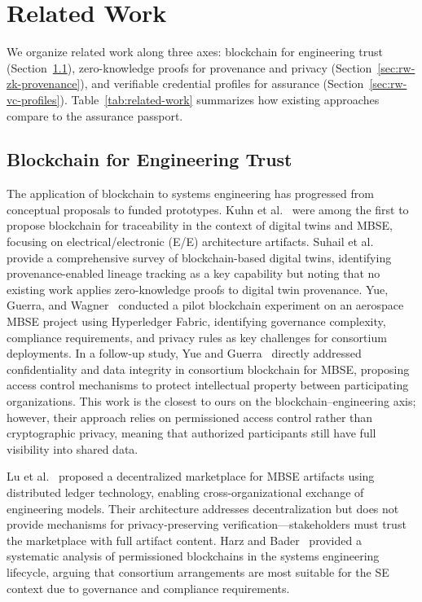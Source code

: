 \section{Related Work}
\label{sec:related-work}

We organize related work along three axes: blockchain for engineering trust (Section~\ref{sec:rw-blockchain-eng}), zero-knowledge proofs for provenance and privacy (Section~\ref{sec:rw-zk-provenance}), and verifiable credential profiles for assurance (Section~\ref{sec:rw-vc-profiles}).
Table~\ref{tab:related-work} summarizes how existing approaches compare to the assurance passport.

\subsection{Blockchain for Engineering Trust}
\label{sec:rw-blockchain-eng}

The application of blockchain to systems engineering has progressed from conceptual proposals to funded prototypes.
Kuhn et al.~\cite{kuhn2017digital_twin_blockchain} were among the first to propose blockchain for traceability in the context of digital twins and MBSE, focusing on electrical/electronic (E/E) architecture artifacts.
Suhail et al.~\cite{suhail2022bcdt} provide a comprehensive survey of blockchain-based digital twins, identifying provenance-enabled lineage tracking as a key capability but noting that no existing work applies zero-knowledge proofs to digital twin provenance.
Yue, Guerra, and Wagner~\cite{yue2021blockchain_mbse} conducted a pilot blockchain experiment on an aerospace MBSE project using Hyperledger Fabric, identifying governance complexity, compliance requirements, and privacy rules as key challenges for consortium deployments.
In a follow-up study, Yue and Guerra~\cite{yue2023confidentiality} directly addressed confidentiality and data integrity in consortium blockchain for MBSE, proposing access control mechanisms to protect intellectual property between participating organizations.
This work is the closest to ours on the blockchain--engineering axis; however, their approach relies on permissioned access control rather than cryptographic privacy, meaning that authorized participants still have full visibility into shared data.

Lu et al.~\cite{lu2020decentralized} proposed a decentralized marketplace for MBSE artifacts using distributed ledger technology, enabling cross-organizational exchange of engineering models.
Their architecture addresses decentralization but does not provide mechanisms for privacy-preserving verification---stakeholders must trust the marketplace with full artifact content.
Harz and Bader~\cite{harz2020permissioned} provided a systematic analysis of permissioned blockchains in the systems engineering lifecycle, arguing that consortium arrangements are most suitable for the SE context due to governance and compliance requirements.

